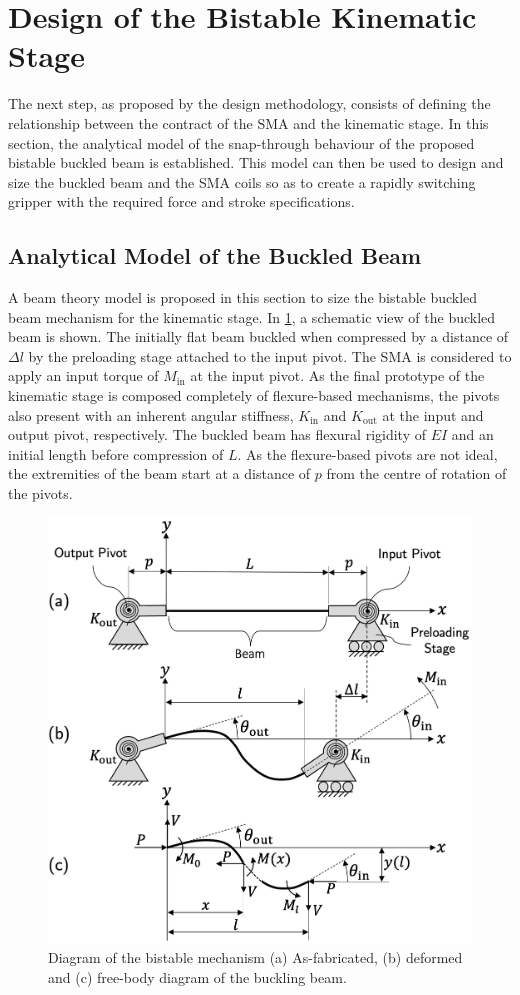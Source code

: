 \section{Design of the Bistable Kinematic Stage}
The next step, as proposed by the design methodology, consists of defining the relationship between the contract of the SMA and the kinematic stage. In this section, the analytical model of the snap-through behaviour of the proposed bistable buckled beam is established. This model can then be used to design and size the buckled beam and the SMA coils so as to create a rapidly switching gripper with the required force and stroke specifications.
\subsection{Analytical Model of the Buckled Beam}
A beam theory model is proposed in this section to size the bistable buckled beam mechanism for the kinematic stage. In \cref{fig:buckled-beam-schematic}, a schematic view of the buckled beam is shown. The initially flat beam buckled when compressed by a distance of $\Delta l$ by the preloading stage attached to the input pivot. The SMA is considered to apply an input torque of $M_\mathrm{in}$ at the input pivot. As the final prototype of the kinematic stage is composed completely of flexure-based mechanisms, the pivots also present with an inherent angular stiffness, $K_\mathrm{in}$ and $K_\mathrm{out}$ at the input and output pivot, respectively. The buckled beam has  flexural rigidity of $EI$ and an initial length before compression of $L$. As the flexure-based pivots are not ideal, the extremities of the beam start at a distance of $p$ from the centre of rotation of the pivots.
\begin{figure}[hbt!] %
  \centering
  \includegraphics[width=0.7\columnwidth]{images/chap7/buckled_beam_model.png}
  \caption[Diagram of the bistable mechanism]{Diagram of the bistable mechanism (a) As-fabricated, (b) deformed and (c) free-body diagram of the buckling beam.}
  \label{fig:buckled-beam-schematic}
\end{figure}

